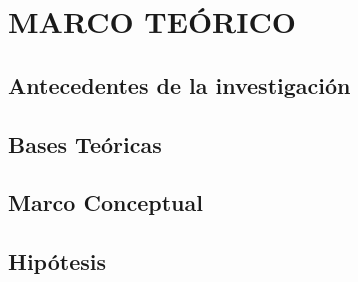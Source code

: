 \chapter{MARCO TEÓRICO}
\section{Antecedentes de la investigación}


\section{Bases Teóricas}


\section{Marco Conceptual}

\section{Hipótesis}

